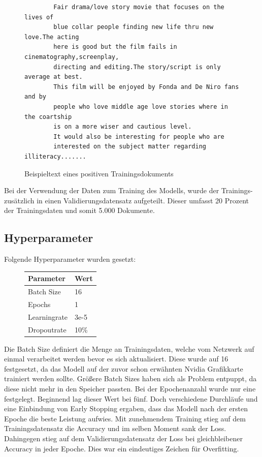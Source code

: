 \documentclass[DIV=13,fontsize=11pt]{scrartcl}
\begin{document}
\begin{figure}[H]
    \centering
    \begin{lstlisting}
        Fair drama/love story movie that focuses on the lives of 
        blue collar people finding new life thru new love.The acting 
        here is good but the film fails in cinematography,screenplay,
        directing and editing.The story/script is only average at best.
        This film will be enjoyed by Fonda and De Niro fans and by 
        people who love middle age love stories where in the coartship 
        is on a more wiser and cautious level.
        It would also be interesting for people who are 
        interested on the subject matter regarding illiteracy.......
    \end{lstlisting}
    \caption{Beispieltext eines positiven Trainingsdokuments}
\end{figure}

Bei der Verwendung der Daten zum Training des Modells, wurde der Trainings- zusätzlich in einen
Validierungsdatensatz aufgeteilt. Dieser umfasst 20 Prozent der Trainingsdaten und somit 5.000 Dokumente.

\subsection{Hyperparameter}

Folgende Hyperparameter wurden gesetzt:

\begin{figure}[H]
    \centering
    \begin{tabular}{ll}
        \toprule
        Parameter    & Wert \\
        \midrule
        Batch Size   & 16   \\
        Epochs       & 1    \\
        Learningrate & 3e-5 \\
        Dropoutrate  & 10\% \\
        \bottomrule
    \end{tabular}
\end{figure}

Die Batch Size definiert die Menge an Trainingsdaten, welche vom Netzwerk auf einmal
verarbeitet werden bevor es sich aktualisiert. Diese wurde auf 16 festgesetzt, da das
Modell auf der zuvor schon erwähnten Nvidia Grafikkarte trainiert werden sollte.
Größere Batch Sizes haben sich als Problem entpuppt, da diese nicht mehr in den
Speicher passten.
Bei der Epochenanzahl wurde nur eine festgelegt.
Beginnend lag dieser Wert bei fünf. Doch verschiedene Durchläufe und eine Einbindung
von Early Stopping ergaben, dass das Modell nach der ersten Epoche die
beste Leistung aufwies. Mit zunehmendem Training stieg auf dem Trainingsdatensatz
die Accuracy und im selben Moment sank der Loss. Dahingegen stieg auf dem Validierungsdatensatz
der Loss bei gleichbleibener Accuracy in jeder Epoche. Dies war ein eindeutiges
Zeichen für Overfitting.
\end{document}

